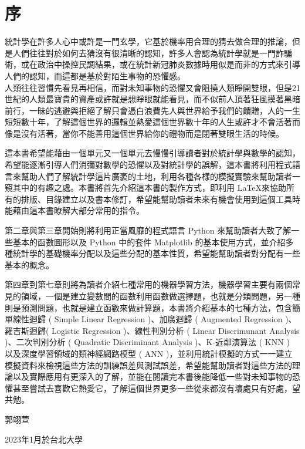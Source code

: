 \chapter*{序}

統計學在許多人心中或許是一門玄學，它基於機率用合理的猜去做合理的推論，但是人們往往對於如何去猜沒有很清晰的認知，許多人會認為統計學就是一門詐騙術，或在政治中操控民調結果，或在統計新冠肺炎數據時用似是而非的方式來引導人們的認知，而這都是基於對陌生事物的恐懼感。\\

人類往往習慣先看見再相信，而對未知事物的恐懼又會阻撓人類睜開雙眼，但是21世紀的人類最寶貴的資產或許就是想睜眼就能看見，而不似前人頂著狂風摸著黑暗前行，一昧的逃避與拒絕了解只會憑白浪費先人與世界給予我們的饋贈，人的一生短短數十年，了解這個世界的邏輯並熱愛這個世界數十年的人生或許才不會活著而像是沒有活著，當你不能善用這個世界給你的禮物而是閉著雙眼生活的時候。

這本書希望能藉由一個單元又一個單元去慢慢引導讀者對於統計學與數學的認知，希望能逐漸引導人們消彌對數學的恐懼以及對統計學的誤解，這本書將利用程式語言來幫助人們了解統計學這片廣袤的土地，利用各種各樣的模擬實驗來幫助讀者一窺其中的有趣之處。本書將首先介紹這本書的製作方式，即利用 \LaTeX 來協助所有的排版、目錄建立以及書本修訂，希望能幫助讀者未來有機會使用到這個工具時能藉由這本書瞭解大部分常用的指令。

第二章與第三章開始則將利用正當風靡的程式語言 Python 來幫助讀者大致了解一些基本的函數圖形以及 Python 中的套件 Matplotlib 的基本使用方式，並介紹多種統計學的基礎機率分配以及這些分配的基本性質，希望能幫助讀者對分配有一些基本的概念。

第四章到第七章則將為讀者介紹七種常用的機器學習方法，機器學習主要有兩個常見的領域，一個是建立變數間的函數利用函數做選擇題，也就是分類問題，另一種則是預測問題，也就是建立函數來做計算題，本書將介紹基本的七種方法，包含簡單線性迴歸 ( Simple Linear Regression )、加廣迴歸 ( Augmented Regression )、羅吉斯迴歸( Logistic Regression )、線性判別分析 ( Linear Discrimunant Analysis )、二次判別分析 ( Quadratic Discriminant Analysis )、K-近鄰演算法 ( KNN ) 以及深度學習領域的類神經網路模型 ( ANN )，並利用統計模擬的方式一一建立模擬資料來檢視這些方法的訓練誤差與測試誤差，希望能幫助讀者對這些方法的理論以及實際應用有更深入的了解，並能在閱讀完本書後能降低一些對未知事物的恐懼甚至嘗試去喜歡它熱愛它，了解這個世界更多一些從來都沒有壞處只有好處，望共勉。

\begin{flushright}
    郭翊萱
    \par\vspace*{-2pt}\hfill 2023年1月於台北大學
\end{flushright}
